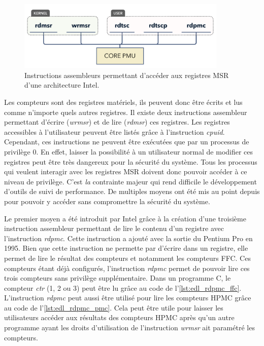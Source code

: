         \begin{figure}[h!]
            \center
            \includegraphics[width=10cm]{images/edl_perf_assembly_msr.png}
            \caption{\label{fig:edl_perf_assembly_msr} Instructions assembleurs permettant d'accéder aux registres MSR d'une architecture Intel.}
        \end{figure}
    
    
        Les compteurs sont des registres matériels, ils peuvent donc être écrits et lus comme n'importe quels autres registres. Il existe deux instructions assembleur permettant d'écrire (\textit{wrmsr}) et de lire (\textit{rdmsr}) ces registres. Les registres accessibles à l'utilisateur peuvent être listés grâce à l'instruction \textit{cpuid}. Cependant, ces instructions ne peuvent être exécutées que par un processus de privilège 0. En effet, laisser la possibilité à un utilisateur normal de modifier ces registres peut être très dangereux pour la sécurité du système. Tous les processus qui veulent interagir avec les registres MSR doivent donc pouvoir accéder à ce niveau de privilège. C'est \textit{la} contrainte majeur qui rend difficile le développement d'outils de suivi de performance. De multiples moyens ont été mis au point depuis pour pouvoir y accéder sans compromettre la sécurité du système. 
        
        Le premier moyen a été introduit par Intel grâce à la création d'une troisième instruction assembleur permettant de lire le contenu d'un registre avec l'instruction \textit{rdpmc}. Cette instruction a ajouté avec la sortie du Pentium Pro en 1995. Bien que cette instruction ne permette par d'écrire dans un registre, elle permet de lire le résultat des compteurs et notamment les compteurs FFC. Ces compteurs étant déjà configurés, l'instruction \textit{rdpmc} permet de pouvoir lire ces trois compteurs sans privilège supplémentaire. Dans un programme C, le compteur \textit{ctr} (1, 2 ou 3) peut être lu grâce au code de l'\autoref{lst:edl_rdpmc_ffc}. L'instruction \textit{rdpmc} peut aussi être utilisé pour lire les compteurs HPMC grâce au code de l'\autoref{lst:edl_rdpmc_pmc}. Cela peut être utile pour laisser les utilisateurs accéder aux résultats des compteurs HPMC après qu'un autre programme ayant les droits d'utilisation de l'instruction \textit{wrmsr} ait paramétré les compteurs.
    
